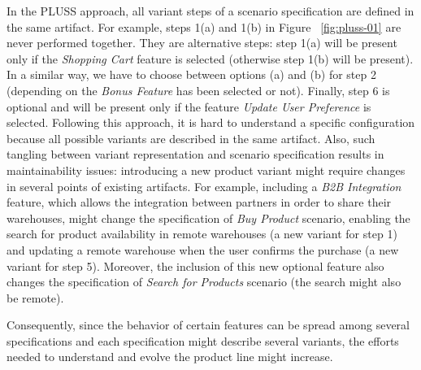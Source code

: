 In the PLUSS approach, all variant steps of a scenario specification are defined in the same artifact. For example, steps 1(a) and 1(b) in Figure ~\ref{fig:pluss-01} are 
never performed together. They are alternative steps: step 1(a) will be present only if the \emph{Shopping Cart} feature is selected (otherwise step 1(b) will be present). In a similar way, we have to choose between options (a) and (b) for step 2 (depending on the \emph{Bonus Feature} has been selected or not). Finally, step 6 is optional and will be present only if the feature \emph{Update User Preference} is selected. Following this approach, it is hard to understand a specific configuration because all possible variants are described in the same artifact. Also, such tangling between variant representation and scenario specification results in maintainability issues: introducing a new product variant might require changes in several points of existing artifacts.  For example, including a \emph{B2B Integration} feature, which allows the integration between partners in order to share their warehouses, might change the specification of \emph{Buy Product} scenario, enabling the search for product availability in remote warehouses (a new variant for step 1) and updating a remote warehouse when the user confirms the purchase (a new variant for step 5). Moreover, the inclusion of this new optional feature also changes the specification of \emph{Search for Products} scenario (the search might also be remote). 

Consequently, since the behavior of certain features can be spread among several specifications and each specification might describe several variants, the efforts needed to understand and evolve the product line might increase.    

